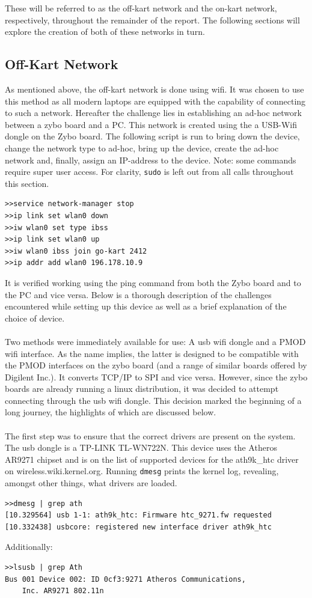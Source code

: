 These will be referred to as the off-kart network and the on-kart network, respectively, throughout the remainder of the report.
The following sections will explore the creation of both of these networks in turn.

\subsection{Off-Kart Network}
As mentioned above, the off-kart network is done using wifi.
It was chosen to use this method as all modern laptops are equipped with the capability of connecting to such a network.
Hereafter the challenge lies in establishing an ad-hoc network between a zybo board and a PC.
This network is created using the a USB-Wifi dongle on the Zybo board. 
The following script is run to bring down the device, change the network type to ad-hoc, bring up the device, create the ad-hoc network and, finally, assign an IP-address to the device.
Note: some commands require super user access.
For clarity, \texttt{sudo} is left out from all calls throughout this section.
\begin{lstlisting}
>>service network-manager stop
>>ip link set wlan0 down
>>iw wlan0 set type ibss
>>ip link set wlan0 up
>>iw wlan0 ibss join go-kart 2412
>>ip addr add wlan0 196.178.10.9
\end{lstlisting}
It is verified working using the ping command from both the Zybo board and to the PC and vice versa.
Below is a thorough description of the challenges encountered while setting up this device as well as a brief explanation of the choice of device.
\\~\\
Two methods were immediately available for use: A usb wifi dongle and a PMOD wifi interface.
As the name implies, the latter is designed to be compatible with the PMOD interfaces on the zybo board (and a range of similar boards offered by Digilent Inc.).
It converts TCP/IP to SPI and vice versa.
However, since the zybo boards are already running a linux distribution, it was decided to attempt connecting through the usb wifi dongle.
This decision marked the beginning of a long journey, the highlights of which are discussed below. 
\\~\\
The first step was to ensure that the correct drivers are present on the system.
The usb dongle is a TP-LINK TL-WN722N.
This device uses the Atheros AR9271 chipset and is on the list of supported devices for the ath9k\_htc driver on wireless.wiki.kernel.org.
Running \texttt{dmesg} prints the kernel log, revealing, amongst other things, what drivers are loaded.
\begin{lstlisting}
>>dmesg | grep ath
[10.329564] usb 1-1: ath9k_htc: Firmware htc_9271.fw requested
[10.332438] usbcore: registered new interface driver ath9k_htc
\end{lstlisting}
Additionally:
\begin{lstlisting}
>>lsusb | grep Ath
Bus 001 Device 002: ID 0cf3:9271 Atheros Communications, 
	Inc. AR9271 802.11n
\end{lstlisting}


